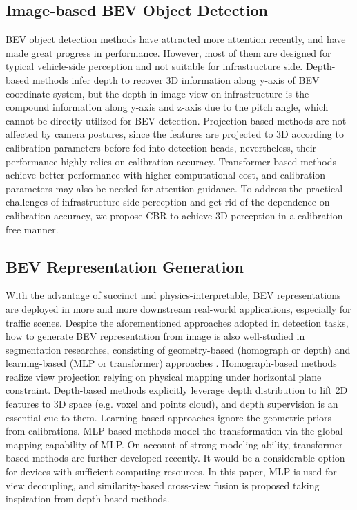 \documentclass[letterpaper, 10 pt, conference]{ieeeconf}
\begin{document}
\subsection{Image-based BEV Object Detection}
BEV object detection methods have attracted more attention recently, and have made great progress in performance. However, most of them are designed for typical vehicle-side perception and not suitable for infrastructure side. 
Depth-based methods \cite{bevdet, bevdepth, caddn} infer depth to recover 3D information along y-axis of BEV coordinate system, but the depth in image view on infrastructure is the compound information along y-axis and z-axis due to the pitch angle, which cannot be directly utilized for BEV detection. Projection-based methods \cite{imvoxelnet, OFT} are not affected by camera postures, since the features are projected to 3D according to calibration parameters before fed into detection heads, nevertheless, their performance highly relies on calibration accuracy. Transformer-based methods \cite{saha2022translating, petr, bevformer, bevformer2} achieve better performance with higher computational cost, and calibration parameters may also be needed for attention guidance.
 To address the practical challenges of infrastructure-side perception and get rid of the dependence on calibration accuracy, we propose CBR to achieve 3D perception in a calibration-free manner. 

\subsection{BEV Representation Generation}
With the advantage of succinct and physics-interpretable, BEV representations are deployed in more and more downstream real-world applications, especially for traffic scenes. Despite the aforementioned approaches adopted in detection tasks, how to generate BEV representation from image is also well-studied in segmentation researches, consisting of geometry-based (homograph or depth) and learning-based (MLP or transformer) approaches \cite{bevsurvey}. Homograph-based methods \cite{ipm} realize view projection relying on physical mapping under horizontal plane constraint. Depth-based methods \cite{OFT, caddn, lss, bevdepth, bevdet} explicitly leverage depth distribution to lift 2D features to 3D space (e.g. voxel and points cloud), and depth supervision is an essential cue to them. Learning-based approaches ignore the geometric priors from calibrations. MLP-based methods \cite{vpn, pon, pyva} model the transformation via the global mapping capability of MLP. On account of strong modeling ability, transformer-based methods \cite{petr, bevformer, bevformer2} are further developed recently. It would be a considerable option for devices with sufficient computing resources. In this paper, MLP is used for view decoupling, and similarity-based cross-view fusion is proposed taking inspiration from depth-based methods.
\end{document}
